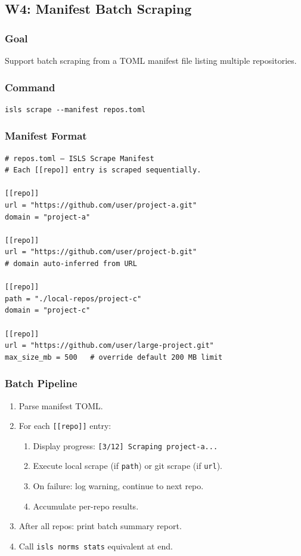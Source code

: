 \documentclass[11pt,a4paper]{article}
\begin{document}
\subsection{W4: Manifest Batch Scraping}
\label{sec:w4}

\subsubsection{Goal}

Support batch scraping from a TOML manifest file listing multiple
repositories.

\subsubsection{Command}

\begin{lstlisting}[style=bash]
isls scrape --manifest repos.toml
\end{lstlisting}

\subsubsection{Manifest Format}

\begin{lstlisting}[style=toml]
# repos.toml — ISLS Scrape Manifest
# Each [[repo]] entry is scraped sequentially.

[[repo]]
url = "https://github.com/user/project-a.git"
domain = "project-a"

[[repo]]
url = "https://github.com/user/project-b.git"
# domain auto-inferred from URL

[[repo]]
path = "./local-repos/project-c"
domain = "project-c"

[[repo]]
url = "https://github.com/user/large-project.git"
max_size_mb = 500   # override default 200 MB limit
\end{lstlisting}

\subsubsection{Batch Pipeline}

\begin{enumerate}[nosep]
\item Parse manifest TOML.
\item For each \texttt{[[repo]]} entry:
      \begin{enumerate}[nosep,label=\alph*.]
      \item Display progress: \texttt{[3/12] Scraping project-a...}
      \item Execute local scrape (if \texttt{path}) or git scrape
            (if \texttt{url}).
      \item On failure: log warning, continue to next repo.
      \item Accumulate per-repo results.
      \end{enumerate}
\item After all repos: print batch summary report.
\item Call \texttt{isls norms stats} equivalent at end.
\end{enumerate}
\end{document}
